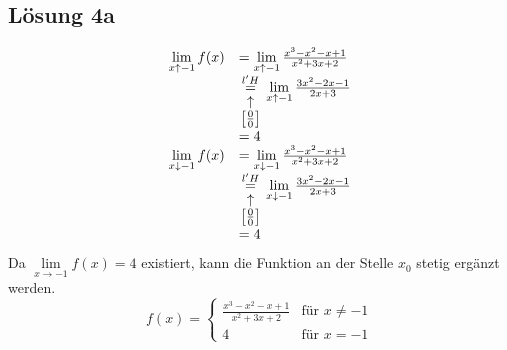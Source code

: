 \documentclass[main.tex]{subfiles}
\begin{document}
\subsection{Lösung 4a}
\begin{equation*}
    \begin{array}{ r l }
    \lim\limits _{x\uparrow -1} f( x) & =\lim\limits _{x\uparrow -1}\frac{x^{3} -x^{2} -x+1}{x^{2} +3x+2}\\
     & \underset{\arraycolsep=1pt\def\arraystretch{1}
     \begin{array}{c}
    \uparrow \\
    \left[\frac{0}{0}\right]
    \end{array}}{\overset{l'H}{=}}\lim\limits _{x\uparrow -1}\frac{3x^{2} -2x -1}{2x +3}\\
     & =4\\
    \lim\limits _{x\downarrow -1} f( x) & =\lim\limits _{x\downarrow -1}\frac{x^{3} -x^{2} -x+1}{x^{2} +3x+2}\\
     & \underset{\arraycolsep=1pt\def\arraystretch{1}
     \begin{array}{c}
    \uparrow \\
    \left[\frac{0}{0}\right]
    \end{array}}{\overset{l'H}{=}}\lim\limits _{x\downarrow -1}\frac{3x^{2} -2x -1}{2x +3}\\
     & =4
    \end{array}
    \end{equation*}
    Da $\lim\limits _{x\rightarrow -1} f( x) =4$ existiert, kann die Funktion an der Stelle $x_{0}$ stetig ergänzt werden.
    \begin{equation*}
    f( x) =\begin{cases}
    \frac{x^{3} -x^{2} -x+1}{x^{2} +3x+2} & \text{für } x\neq -1\\
    4 & \text{für } x=-1
    \end{cases}
\end{equation*}
\end{document}
